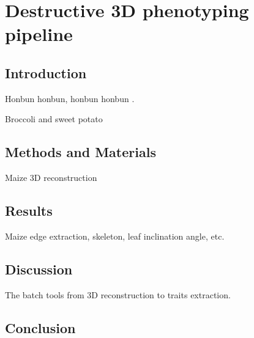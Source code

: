 \chapter{Destructive 3D phenotyping pipeline}

% 

\section{Introduction}

Honbun honbun, honbun honbun \citep{zhao_crop_2019}. 

Broccoli and sweet potato


\section{Methods and Materials}

Maize 3D reconstruction


\section{Results}

Maize edge extraction, skeleton, leaf inclination angle, etc.

\section{Discussion}

The batch tools from 3D reconstruction to traits extraction.

\section{Conclusion}